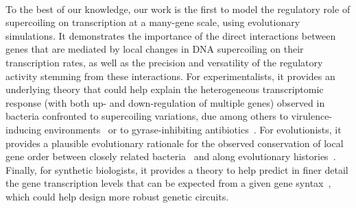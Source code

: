 \paragraph{}
To the best of our knowledge, our work is the first to model the regulatory role of supercoiling on transcription at a many-gene scale, using evolutionary simulations.
It demonstrates the importance of the direct interactions between genes that are mediated by local changes in DNA supercoiling on their transcription rates, as well as the precision and versatility of the regulatory activity stemming from these interactions.
For experimentalists, it provides an underlying theory that could help explain the heterogeneous transcriptomic response (with both up- and down-regulation of multiple genes) observed in bacteria confronted to supercoiling variations, due among others to virulence-inducing environments~\citep{dorman2019} or to gyrase-inhibiting antibiotics~\citep{delacampa2017}.
For evolutionists, it provides a plausible evolutionary rationale for the observed conservation of local gene order between closely related bacteria~\citep{junier2016} and along evolutionary histories~\citep{brinza2013}.
Finally, for synthetic biologists, it provides a theory to help predict in finer detail the gene transcription levels that can be expected from a given gene syntax~\citep{johnstone2022}, which could help design more robust genetic circuits.
